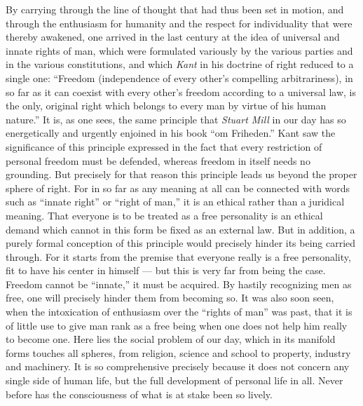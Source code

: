 \documentclass[12pt,a4paper,openany]{book}
\newcommand{\opage}[1]{\marginnote{\footnotesize\textit{[#1]}}}
\begin{document}
By carrying through the line of thought that had thus been set in motion,
and through the enthusiasm for \opage{99}humanity and the respect for
individuality that were thereby awakened, one arrived in the last century
at the idea of universal and innate rights of man, which were formulated
variously by the various parties and in the various constitutions, and
which \emph{Kant} in his doctrine of right reduced to a single one: ``Freedom
(independence of every other's compelling arbitrariness), in so far as it
can coexist with every other's freedom according to a universal law, is
the only, original right which belongs to every man by virtue of his human
nature.'' It is, as one sees, the same principle that \emph{Stuart Mill}
in our day has so energetically and urgently enjoined in his book ``om
Friheden.'' Kant saw the significance of this principle expressed in the
fact that every restriction of personal freedom must be defended, whereas
freedom in itself needs no grounding. But precisely for that reason this
principle leads us beyond the proper sphere of right. For in so far as any
meaning at all can be connected with words such as ``innate right'' or
``right of man,'' it is an ethical rather than a juridical meaning. That
everyone is to be treated as a free personality is an ethical demand which
cannot in this form be fixed as an external law. But in addition, a purely
formal conception of this principle would precisely hinder its being
carried through. For it starts from the premise that everyone really is a
free personality, fit to have his center in himself --- but this is very
far from being the case. Freedom cannot be ``innate,'' it must be acquired.
\opage{100}By hastily recognizing men as free, one will precisely hinder
them from becoming so. It was also soon seen, when the intoxication of
enthusiasm over the ``rights of man'' was past, that it is of little use to
give man rank as a free being when one does not help him really to become
one. Here lies the social problem of our day, which in its manifold forms
touches all spheres, from religion, science and school to property,
industry and machinery. It is so comprehensive precisely because it does
not concern any single side of human life, but the full development of
personal life in all. Never before has the consciousness of what is at
stake been so lively.
\end{document}
